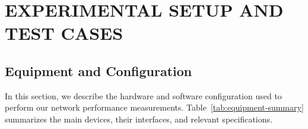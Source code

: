 
\section{EXPERIMENTAL SETUP AND TEST CASES} \label{sec:experimental-setup-and-test-cases}


    \subsection{Equipment and Configuration} \label{subsec:equipment-and-configuration}

        In this section, we describe the hardware and software configuration used to perform our network performance measurements. 
        Table~\ref{tab:equipment-summary} summarizes the main devices, their interfaces, and relevant specifications. 

        \vspace{-0.1cm} %


